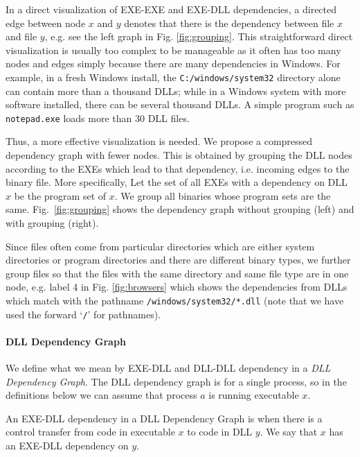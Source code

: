 In a direct visualization of EXE-EXE and EXE-DLL dependencies,
a directed edge between node $x$ and $y$ denotes that there is
the dependency between file $x$ and file $y$,
e.g. see the left graph in Fig. \ref{fig:grouping}.
This straightforward direct visualization is usually too complex
to be manageable as it often has too many nodes and edges simply 
because there are many dependencies in Windows.
For example, in a fresh Windows install,
the {\tt C:/windows/system32} directory alone can contain more
than a thousand DLLs; while in a Windows system with more software installed,
there can be several thousand DLLs.
A simple program such as {\tt notepad.exe} loads more than 30 DLL files.

Thus, a more effective visualization is needed.
We propose a compressed dependency graph with fewer nodes.
This is obtained by grouping the DLL nodes according to the
EXEs which lead to that dependency,
i.e. incoming edges to the binary file.
More specifically, Let the set of all EXEs with a dependency on DLL $x$
be the program set of $x$.
We group all binaries whose program sets are the same.
Fig.~\ref{fig:grouping} shows the dependency graph without grouping (left) and
with grouping (right).

Since files often come from particular directories which are either system
directories or program directories and there are different binary types,
we further group files so that the files with the same directory and
same file type are in one node, e.g. label 4 in Fig. \ref{fig:browsers}
which shows the dependencies from DLLs which match with the
pathname {\tt /windows/system32/*.dll} (note that we have used 
the forward `{\tt /}' for pathnames).

\paragraph{DLL Dependency Graph}

We define what we mean by EXE-DLL and DLL-DLL dependency in
a {\em DLL Dependency Graph}. The DLL dependency graph
is for a single process, so in the definitions below
we can assume that process $a$ is running executable $x$.

\begin{definition}
An EXE-DLL dependency in a DLL Dependency Graph
is when there is a control transfer from code in executable $x$ 
to code in DLL $y$. 
We say that $x$ has an EXE-DLL dependency on $y$.
\end{definition}

